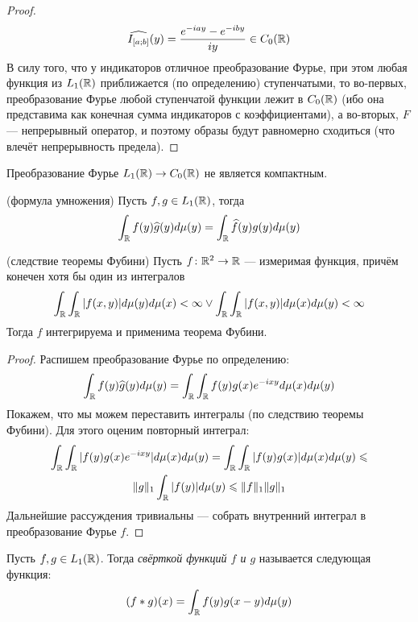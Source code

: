 \begin{proof}
	\[
		\widehat{I_{[a; b]}}(y) = \frac{e^{-iay} - e^{-iby}}{iy} \in C_0(\mathbb{R})
	\]
	В силу того, что у индикаторов отличное преобразование Фурье, при этом любая функция из $L_1(\mathbb{R})$ приближается (по определению) ступенчатыми, то во-первых, преобразование Фурье любой ступенчатой функции лежит в $C_0(\mathbb{R})$ (ибо она представима как конечная сумма индикаторов с коэффициентами), а во-вторых, $F$ --- непрерывный оператор, и поэтому образы будут равномерно сходиться (что влечёт непрерывность предела).
\end{proof}

\begin{exercise}
	Преобразование Фурье $L_1(\mathbb{R}) \to C_0(\mathbb{R})$ не является компактным.
\end{exercise}

\begin{proposition} (формула умножения)
	Пусть $f, g \in L_1(\mathbb{R})$, тогда
	\[
		\int_{\mathbb{R}} f(y)\widehat{g}(y)d\mu(y) = \int_{\mathbb{R}} \widehat{f}(y)g(y)d\mu(y)
	\]
\end{proposition}

\begin{reminder} (следствие теоремы Фубини)
	Пусть $f \colon \mathbb{R}^2 \to \mathbb{R}$ --- измеримая функция, причём конечен хотя бы один из интегралов
	\[
		\int_{\mathbb{R}} \int_{\mathbb{R}} |f(x, y)|d\mu(y)d\mu(x) < \infty \vee \int_{\mathbb{R}} \int_{\mathbb{R}} |f(x, y)|d\mu(x)d\mu(y) < \infty
	\]
	Тогда $f$ интегрируема и применима теорема Фубини.
\end{reminder}

\begin{proof}
	Распишем преобразование Фурье по определению:
	\[
		\int_{\mathbb{R}} f(y)\widehat{g}(y)d\mu(y) = \int_{\mathbb{R}} \int_{\mathbb{R}} f(y)g(x)e^{-ixy}d\mu(x)d\mu(y)
	\]
	Покажем, что мы можем переставить интегралы (по следствию теоремы Фубини). Для этого оценим повторный интеграл:
	\begin{multline*}
		\int_{\mathbb{R}} \int_{\mathbb{R}} |f(y)g(x)e^{-ixy}|d\mu(x)d\mu(y) = \int_{\mathbb{R}} \int_{\mathbb{R}} |f(y)g(x)|d\mu(x)d\mu(y) \leqslant
		\\
		\|g\|_1\int_{\mathbb{R}} |f(y)|d\mu(y) \leqslant \|f\|_1\|g\|_1
	\end{multline*}
	Дальнейшие рассуждения тривиальны --- собрать внутренний интеграл в преобразование Фурье $f$.
\end{proof}

\begin{definition}
	Пусть $f, g \in L_1(\mathbb{R})$. Тогда \textit{свёрткой функций $f$ и $g$} называется следующая функция:
	\[
		(f * g)(x) = \int_{\mathbb{R}} f(y)g(x - y)d\mu(y)
	\]
\end{definition}

